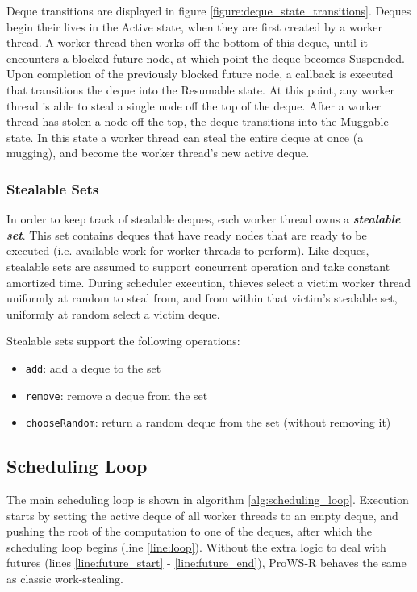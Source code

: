 \documentclass[bsc,frontabs,singlespacing,parskip,deptreport,normalheadings]{infthesis}
\begin{document}
Deque transitions are displayed in figure \ref{figure:deque_state_transitions}.
Deques begin their lives in the Active state, when they are first created by a
worker thread. A worker thread then works off the bottom of this deque, until it
encounters a blocked future node, at which point the deque becomes Suspended.
Upon completion of the previously blocked future node, a callback is executed
that transitions the deque into the Resumable state. At this point, any worker
thread is able to steal a single node off the top of the deque. After a worker
thread has stolen a node off the top, the deque transitions into the Muggable
state. In this state a worker thread can steal the entire deque at once (a
mugging), and become the worker thread's new active deque.

\subsubsection*{Stealable Sets}
\label{subsubsection:stealable_sets}

In order to keep track of stealable deques, each worker thread owns a
\textbf{\textit{stealable set}}. This set contains deques that have ready nodes
that are ready to be executed (i.e. available work for worker threads to
perform). Like deques, stealable sets are assumed to support concurrent
operation and take constant amortized time. During scheduler execution, thieves
select a victim worker thread uniformly at random to steal from, and from within
that victim's stealable set, uniformly at random select a victim deque.

Stealable sets support the following operations:

\begin{itemize}
    \item \texttt{add}: add a deque to the set
    \item \texttt{remove}: remove a deque from the set
    \item \texttt{chooseRandom}: return a random deque from the set (without
        removing it)
\end{itemize}

\subsection{Scheduling Loop}

The main scheduling loop is shown in algorithm \ref{alg:scheduling_loop}.
Execution starts by setting the active deque of all worker threads to an empty
deque, and pushing the root of the computation to one of the deques, after which
the scheduling loop begins (line \ref{line:loop}).
Without the extra logic to deal with futures (lines \ref{line:future_start} -
\ref{line:future_end}), ProWS-R behaves the same as classic work-stealing.
\end{document}
